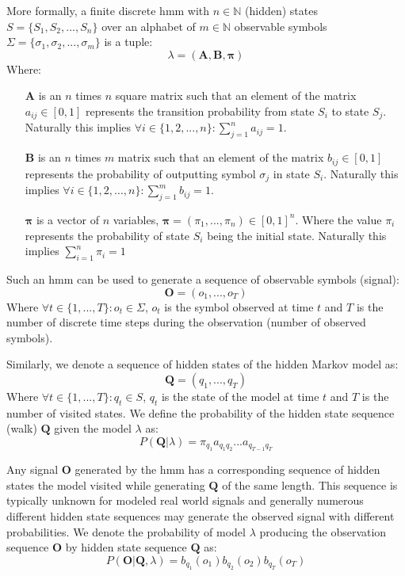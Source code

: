 More formally, a finite discrete \acrlong{hmm} with $n \in \mathbb{N}$ (hidden) states $S = \{S_1, S_2, ..., S_n\}$ over an alphabet of $m \in \mathbb{N}$ observable symbols $\Sigma=\{\sigma_1, \sigma_2, ..., \sigma_m\}$ is a tuple: $$\lambda = (\mathbf{A}, \mathbf{B}, \boldsymbol{\pi})$$
Where:
\begin{itemize}
	\item[$\mathbf{A}$] is an $n$ times $n$ square matrix such that an element of the matrix ${a_{ij} \in [0, 1]}$ represents the transition probability from state $S_i$ to state $S_j$. Naturally this implies ${\forall i \in \{1, 2, ..., n\}: \sum_{j=1}^n{a_{ij}} = 1}$.
	\item[$\mathbf{B}$] is an $n$ times $m$ matrix such that an element of the matrix ${b_{ij} \in [0, 1]}$ represents the probability of outputting symbol $\sigma_j$ in state $S_i$. Naturally this implies ${\forall i \in \{1, 2, ..., n\}: \sum_{j=1}^m{b_{ij}} = 1}$.
	\item[$\boldsymbol{\pi}$] is a vector of $n$ variables, ${\boldsymbol{\pi}=(\pi_1, ..., \pi_n) \in [0, 1]^n}$. Where the value $\pi_i$ represents the probability of state $S_i$ being the initial state. Naturally this implies ${\sum_{i=1}^n{\pi_i} = 1}$
\end{itemize}

Such an \gls{hmm} can be used to generate a sequence of observable symbols (signal): $$\mathbf{O} = (o_1, ..., o_T)$$
Where ${\forall t \in \{1, ..., T\}: o_t \in \Sigma}$, $o_t$ is the symbol observed at time $t$ and $T$ is the number of discrete time steps during the observation (number of observed symbols).

Similarly, we denote a sequence of hidden states of the hidden Markov model as: $$\mathbf{Q} = (q_1, ..., q_T)$$
Where ${\forall t \in \{1, ..., T\}: q_t \in S}$, $q_t$ is the state of the model at time $t$ and $T$ is the number of visited states.
We define the probability of the hidden state sequence (walk) $\mathbf{Q}$ given the model $\lambda$ as:
$$P(\mathbf{Q}|\lambda) = \pi_{q_1}a_{q_1q_2}...a_{q_{T-1}q_T}$$

Any signal $\mathbf{O}$ generated by the \gls{hmm} has a corresponding sequence of hidden states the model visited while generating $\mathbf{Q}$ of the same length. This sequence is typically unknown for modeled real world signals and generally numerous different hidden state sequences may generate the observed signal with different probabilities. We denote the probability of model $\lambda$ producing the observation sequence $\mathbf{O}$ by hidden state sequence $\mathbf{Q}$ as:
$$P(\mathbf{O}|\mathbf{Q},\lambda) = b_{q_1}(o_1)b_{q_2}(o_2)b_{q_T}(o_T)$$

